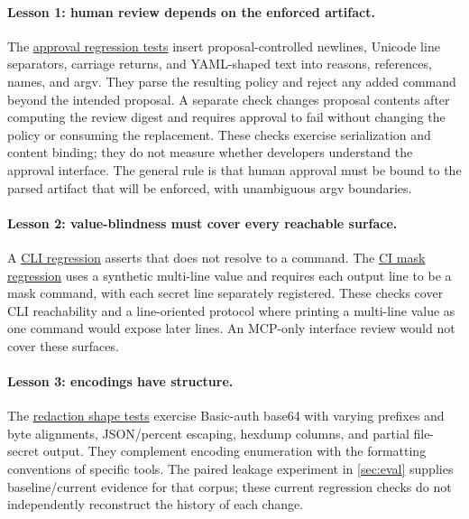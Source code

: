 \documentclass[10pt,twocolumn]{article}
\newcommand{\code}[1]{\textup{\texttt{\detokenize{#1}}}}
\begin{document}
\paragraph{Lesson 1: human review depends on the enforced artifact.}
The \href{https://github.com/Generalized-Labs/ironrun/blob/a4ab72e475bb6d3ed548e0dd7569294a1b3a0e8d/cmd/ironrun/review_test.go}{approval regression tests}
insert proposal-controlled newlines, Unicode line separators, carriage returns,
and YAML-shaped text into reasons, references, names, and argv. They parse the
resulting policy and reject any added command beyond the intended proposal.
A separate check changes proposal contents after computing the review digest
and requires approval to fail without changing the policy or consuming the
replacement. These checks exercise serialization and content binding;
they do not measure whether developers understand the approval interface.
The general rule is that human approval must be bound to the parsed artifact
that will be enforced, with unambiguous argv boundaries.

\paragraph{Lesson 2: value-blindness must cover every reachable surface.}
A \href{https://github.com/Generalized-Labs/ironrun/blob/a4ab72e475bb6d3ed548e0dd7569294a1b3a0e8d/cmd/ironrun/cli_usability_test.go}{CLI regression}
asserts that \code{ironrun env share} does not resolve to a command.
The \href{https://github.com/Generalized-Labs/ironrun/blob/a4ab72e475bb6d3ed548e0dd7569294a1b3a0e8d/internal/execution/github_masks_test.go}{CI mask regression}
uses a synthetic multi-line value and requires each output line to be a mask
command, with each secret line separately registered. These checks cover CLI
reachability and a line-oriented protocol where printing a multi-line value
as one command would expose later lines. An MCP-only interface review would
not cover these surfaces.

\paragraph{Lesson 3: encodings have structure.}
The \href{https://github.com/Generalized-Labs/ironrun/blob/a4ab72e475bb6d3ed548e0dd7569294a1b3a0e8d/internal/redact/shapes_test.go}{redaction shape tests}
exercise Basic-auth base64 with varying prefixes and byte alignments,
JSON/percent escaping, hexdump columns, and partial file-secret output.
They complement encoding enumeration with the formatting conventions of
specific tools. The paired leakage experiment in \cref{sec:eval} supplies
baseline/current evidence for that corpus; these current regression checks do
not independently reconstruct the history of each change.
\end{document}
